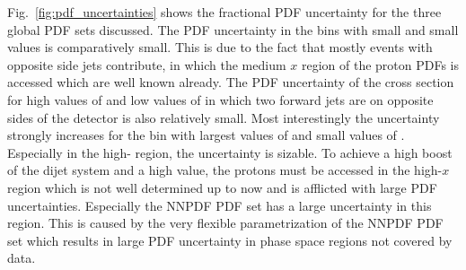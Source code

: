 Fig.~\ref{fig:pdf_uncertainties} shows the fractional PDF uncertainty for the
three global PDF sets discussed. The PDF uncertainty in the bins with small
\ystar and small \yboost values is comparatively small. This is due to the fact
that mostly events with opposite side jets contribute, in which the medium $x$ region
of the proton PDFs is accessed which are well known already. The PDF uncertainty
of the cross section for high values of \ystar and low values of \yboost in
which two forward jets are on opposite sides of the detector is also relatively
small. Most interestingly the uncertainty strongly increases for the bin with
largest values of \yboost and small values of \ystar.  Especially in the high-\pt
region, the uncertainty is sizable. To achieve a high boost of the dijet system
and a high \ptavg value, the protons must be accessed in the high-$x$ region
which is not well determined up to now and is afflicted with large PDF
uncertainties. Especially the NNPDF PDF set has a large uncertainty in this
region. This is caused by the very flexible parametrization of the NNPDF PDF set
which results in large PDF uncertainty in phase space regions not covered by
data.


